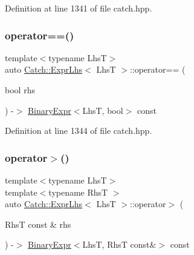 Definition at line 1341 of file catch.\+hpp.

\mbox{\label{class_catch_1_1_expr_lhs_ab707a84abdffbdc35962a495e238d393}} 
\subsubsection{\texorpdfstring{operator==()}{operator==()}\hspace{0.1cm}{\footnotesize\ttfamily [2/2]}}
{\footnotesize\ttfamily template$<$typename LhsT$>$ \\
auto \mbox{\hyperlink{class_catch_1_1_expr_lhs}{Catch\+::\+Expr\+Lhs}}$<$ LhsT $>$\+::operator== (\begin{DoxyParamCaption}\item[{bool}]{rhs }\end{DoxyParamCaption}) -\/$>$ \mbox{\hyperlink{class_catch_1_1_binary_expr}{Binary\+Expr}}$<$LhsT, bool$>$ const \hspace{0.3cm}{\ttfamily [inline]}}



Definition at line 1344 of file catch.\+hpp.

\mbox{\label{class_catch_1_1_expr_lhs_a23cb0cd983a1ac9c3df5160542199b83}} 
\subsubsection{\texorpdfstring{operator$>$()}{operator>()}}
{\footnotesize\ttfamily template$<$typename LhsT$>$ \\
template$<$typename RhsT $>$ \\
auto \mbox{\hyperlink{class_catch_1_1_expr_lhs}{Catch\+::\+Expr\+Lhs}}$<$ LhsT $>$\+::operator$>$ (\begin{DoxyParamCaption}\item[{RhsT const \&}]{rhs }\end{DoxyParamCaption}) -\/$>$ \mbox{\hyperlink{class_catch_1_1_binary_expr}{Binary\+Expr}}$<$LhsT, RhsT const\&$>$ const \hspace{0.3cm}{\ttfamily [inline]}}



